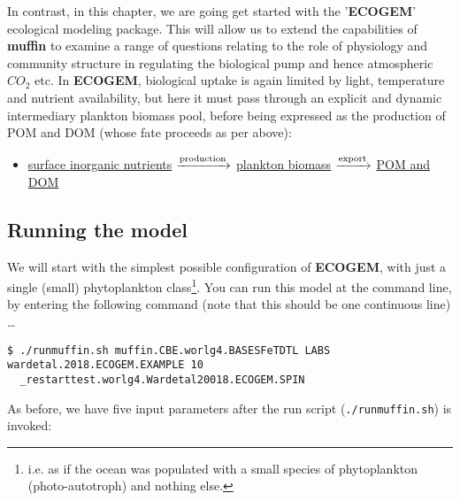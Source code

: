 \documentclass[11pt,fleqn]{book} %
\begin{document}
In contrast, in this chapter, we are going get started with the '\textbf{ECOGEM}' ecological modeling package. This will allow us to extend the capabilities of \textbf{muffin} to examine a range of questions relating to the role of physiology and community structure in regulating the biological pump and hence atmospheric \(CO_{2}\) etc. In \textbf{ECOGEM}, biological uptake is again limited by light, temperature and nutrient availability, but here it must pass through an explicit and dynamic intermediary plankton biomass pool, before being expressed as the production of POM and DOM (whose fate proceeds as per above):
\vspace{4mm}
\begin{itemize}
\item \underline{surface inorganic nutrients} $\xrightarrow[]{\rm production}$ \underline{plankton biomass} $\xrightarrow[]{\rm export}$ \underline{POM and DOM}
\end{itemize}
\vspace{4mm}


\subsection{Running the model}

We will start with the simplest possible configuration of \textbf{ECOGEM}, with just a single (small) phytoplankton class\footnote{i.e. as if the ocean was populated with a small species of phytoplankton (photo-autotroph) and nothing else.}. You can run this model at the command line, by entering the following command (note that this should be one continuous line) \dots
\small\begin{verbatim}
$ ./runmuffin.sh muffin.CBE.worlg4.BASESFeTDTL LABS wardetal.2018.ECOGEM.EXAMPLE 10 
  _restarttest.worlg4.Wardetal20018.ECOGEM.SPIN
\end{verbatim}\normalsize

\noindent As before, we have five input parameters after  the run script (\texttt{./runmuffin.sh}) is invoked:
\end{document}
